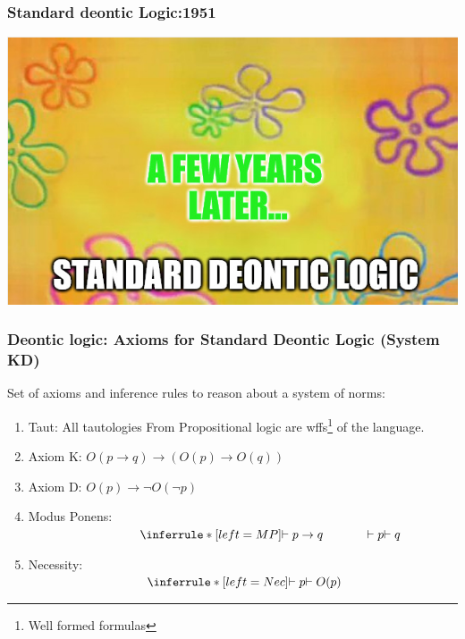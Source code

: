 \documentclass[9pt]{beamer}
\begin{document}
\begin{frame}
\frametitle{Standard deontic Logic:1951}
\centering
\includegraphics[scale=0.60]{sdl.png}
\end{frame}



\begin{frame}
\frametitle{Deontic logic: Axioms for Standard Deontic Logic \cite{von1951deontic} (System KD) }
Set of axioms and inference rules to reason about a system of norms:
\begin{enumerate}
	\item Taut: All  tautologies From Propositional logic are wffs\footnote[frame]{Well formed formulas} of the language.
	\item  Axiom K: $O(p\rightarrow q)\rightarrow (O(p) \rightarrow O(q))$ 
	\item  Axiom D: $O(p)\rightarrow \lnot O(\lnot p)$
	\item Modus Ponens: \\$ ~~~~~~~~~~~~~~~~~~~~~~~~~~\inferrule*[left=MP]{\vdash p \rightarrow q ~~~~~~~~~~ \vdash p}{\vdash q}$
	\item Necessity: \\$~~~~~~~~~~~~~~~~~~~~~~~~~~~~\inferrule*[left=Nec]
	{\vdash p}{\vdash O(p)}$ 
	
\end{enumerate}	
\end{frame}
\end{document}
